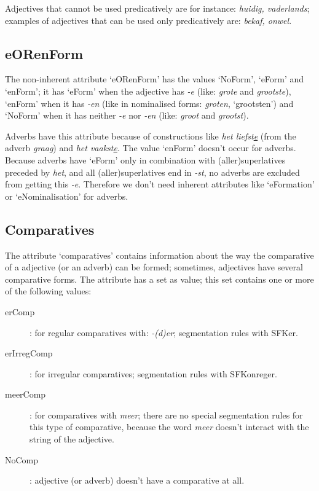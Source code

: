 Adjectives that cannot be used predicatively are for instance: 
{\em huidig, vaderlands}; examples of adjectives that can be used only 
predicatively are: {\em bekaf, onwel}.

\subsection{eORenForm}

The non-inherent attribute `eORenForm' has the values `NoForm', `eForm' 
and `enForm'; it has 
`eForm' when the adjective has {\em -e} (like: {\em grote} and {\em grootste}),
`enForm' when it has {\em -en} (like in nominalised forms: {\em groten}, 
`grootsten')
and `NoForm' when it has neither {\em -e} nor {\em -en} (like: {\em groot} and 
{\em grootst}).

Adverbs have this attribute because of constructions like 
{\em het liefst\underline{e}} (from the adverb {\em graag}) and 
{\em het vaakst\underline{e}}. The value `enForm' doesn't occur for adverbs.
Because adverbs have `eForm' only in combination with (aller)superlatives
preceded by {\em het}, and all (aller)superlatives end in {\em -st}, 
no adverbs are excluded from getting this {\em -e}. Therefore we don't need
inherent attributes like `eFormation' or `eNominalisation' for adverbs.

\subsection{Comparatives}

The attribute `comparatives' contains information about the way the 
comparative of a adjective (or an adverb) can be formed; sometimes, adjectives 
have several comparative forms. The attribute has a set as value; this set 
contains one or more of the following values:

\begin{description}
  \item [erComp]: for regular comparatives with: {\em -(d)er}; segmentation 
                  rules with SFKer.
  \item [erIrregComp]: for irregular comparatives; segmentation rules with 
                  SFKonreger.
  \item [meerComp]: for comparatives with {\em meer}; there are no special 
                  segmentation rules for this type of comparative, because
                  the word {\em meer} doesn't interact with the string of the 
                  adjective.
  \item [NoComp]: adjective (or adverb) doesn't have a comparative at all.

\end{description}

